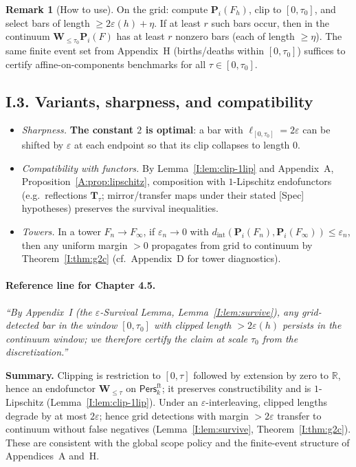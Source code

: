 \documentclass[11pt]{article}
\newcommand{\Pers}{\mathsf{Pers}}
\numberwithin{equation}{section}
\theoremstyle{definition}
\newtheorem{remark}[theorem]{Remark}
\begin{document}
\begin{remark}[How to use]\label{I:rk:practice}
On the grid: compute \(\mathbf{P}_i(F_h)\), clip to \([0,\tau_0]\), and select bars of length \(\ge 2\varepsilon(h)+\eta\). If at least \(r\) such bars occur, then in the continuum \(\mathbf{W}_{\le \tau_0}\mathbf{P}_i(F)\) has at least \(r\) nonzero bars (each of length \(\ge \eta\)). The same finite event set from Appendix~H (births/deaths within \([0,\tau_0]\)) suffices to certify affine-on-components benchmarks for all \(\tau\in[0,\tau_0]\).
\end{remark}

\subsection*{I.3. Variants, sharpness, and compatibility}
\begin{itemize}\itemsep0.25em
\item \emph{Sharpness.} \textbf{The constant \(2\) is optimal}: a bar with \(\ell_{[0,\tau_0]}=2\varepsilon\) can be shifted by \(\varepsilon\) at each endpoint so that its clip collapses to length \(0\).
\item \emph{Compatibility with functors.} By Lemma~\ref{I:lem:clip-1lip} and Appendix~A, Proposition~\ref{A:prop:lipschitz}, composition with \(1\)-Lipschitz endofunctors (e.g.\ reflections \(\mathbf{T}_\tau\); mirror/transfer maps under their stated [Spec] hypotheses) preserves the survival inequalities.
\item \emph{Towers.} In a tower \(F_n\to F_\infty\), if \(\varepsilon_n\to 0\) with \(d_{\mathrm{int}}(\mathbf{P}_i(F_n),\mathbf{P}_i(F_\infty))\le \varepsilon_n\), then any uniform margin \(>\!0\) propagates from grid to continuum by Theorem~\ref{I:thm:g2c} (cf.\ Appendix~D for tower diagnostics).
\end{itemize}

\paragraph{Reference line for Chapter 4.5.}
\emph{“By Appendix~I (the $\varepsilon$-Survival Lemma, Lemma~\ref{I:lem:survive}), any grid-detected bar in the window \([0,\tau_0]\) with clipped length \(>2\varepsilon(h)\) persists in the continuum window; we therefore certify the claim at scale \(\tau_0\) from the discretization.”}

\medskip
\noindent\textbf{Summary.}
Clipping is restriction to \([0,\tau]\) followed by extension by zero to \(\mathbb{R}\), hence an endofunctor \(\mathbf{W}_{\le\tau}\) on \(\Pers^{\mathrm{ft}}_k\); it preserves constructibility and is \(1\)-Lipschitz (Lemma~\ref{I:lem:clip-1lip}). Under an \(\varepsilon\)-interleaving, clipped lengths degrade by at most \(2\varepsilon\); hence grid detections with margin \(>\!2\varepsilon\) transfer to continuum without false negatives (Lemma~\ref{I:lem:survive}, Theorem~\ref{I:thm:g2c}). These are consistent with the global scope policy and the finite-event structure of Appendices~A and~H.
\end{document}
